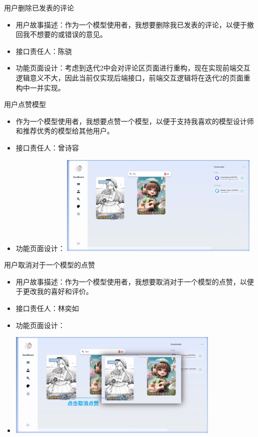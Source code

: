 \begin{frame}{用户删除已发表的评论}
    \begin{itemize}
        \item 用户故事描述：作为一个模型使用者，我想要删除我已发表的评论，以便于撤回我不想要的或错误的意见。
        \item 接口责任人：陈骁
        \item 功能页面设计：考虑到迭代2中会对评论区页面进行重构，现在实现前端交互逻辑意义不大，因此当前仅实现后端接口，前端交互逻辑将在迭代2的页面重构中一并实现。
    \end{itemize}
\end{frame}

\begin{frame}{用户点赞模型}
    \begin{itemize}
        \item 作为一个模型使用者，我想要点赞一个模型，以便于支持我喜欢的模型设计师和推荐优秀的模型给其他用户。
        \item 接口责任人：曾诗容
        \item 功能页面设计： %
        \includegraphics[width=3.8in]{contents/figure/like_model_demo.png}
    \end{itemize}
\end{frame}

\begin{frame}{用户取消对于一个模型的点赞}
    \begin{itemize}
        \item 用户故事描述：作为一个模型使用者，我想要取消对于一个模型的点赞，以便于更改我的喜好和评价。
        \item 接口责任人：林奕如
        \item 功能页面设计：
        \item \includegraphics[width=0.8\textwidth]{contents/figure/model_remove_liked.png}
    \end{itemize}
\end{frame}

